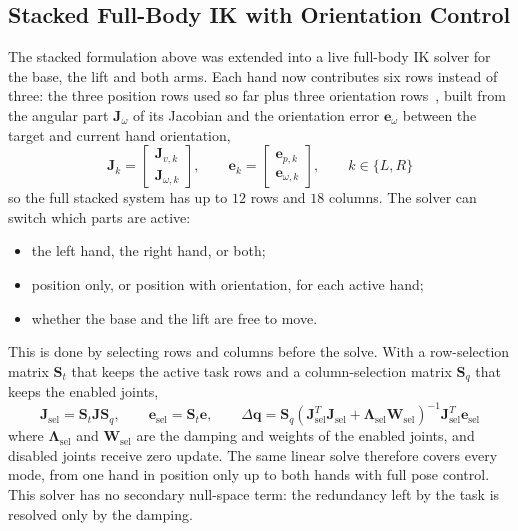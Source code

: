 \documentclass[12pt,a4paper]{article}
\begin{document}
\subsection*{Stacked Full-Body IK with Orientation Control}
The stacked formulation above was extended into a live full-body IK solver for the base, the lift and both arms. Each hand now contributes six rows instead of three: the three position rows used so far plus three orientation rows~\cite{schinstock1994}, built from the angular part $\mathbf{J}_{\omega}$ of its Jacobian and the orientation error $\mathbf{e}_{\omega}$ between the target and current hand orientation,
\begin{equation}
    \mathbf{J}_{k}=\begin{bmatrix}\mathbf{J}_{v,k}\\ \mathbf{J}_{\omega,k}\end{bmatrix},
    \qquad
    \mathbf{e}_{k}=\begin{bmatrix}\mathbf{e}_{p,k}\\ \mathbf{e}_{\omega,k}\end{bmatrix},
    \qquad k\in\{L,R\}
\end{equation}
so the full stacked system has up to $12$ rows and $18$ columns. The solver can switch which parts are active:
\begin{itemize}[nosep]
    \item the left hand, the right hand, or both;
    \item position only, or position with orientation, for each active hand;
    \item whether the base and the lift are free to move.
\end{itemize}
This is done by selecting rows and columns before the solve. With a row-selection matrix $\mathbf{S}_t$ that keeps the active task rows and a column-selection matrix $\mathbf{S}_q$ that keeps the enabled joints,
\begin{equation}
    \mathbf{J}_{\mathrm{sel}}=\mathbf{S}_t\mathbf{J}\mathbf{S}_q,
    \qquad
    \mathbf{e}_{\mathrm{sel}}=\mathbf{S}_t\mathbf{e},
    \qquad
    \Delta\mathbf{q}
    = \mathbf{S}_q\left(\mathbf{J}_{\mathrm{sel}}^{T}\mathbf{J}_{\mathrm{sel}} + \boldsymbol{\Lambda}_{\mathrm{sel}}\mathbf{W}_{\mathrm{sel}}\right)^{-1}\mathbf{J}_{\mathrm{sel}}^{T}\mathbf{e}_{\mathrm{sel}}
    \label{eq:selected_dls}
\end{equation}
where $\boldsymbol{\Lambda}_{\mathrm{sel}}$ and $\mathbf{W}_{\mathrm{sel}}$ are the damping and weights of the enabled joints, and disabled joints receive zero update. The same linear solve therefore covers every mode, from one hand in position only up to both hands with full pose control. This solver has no secondary null-space term: the redundancy left by the task is resolved only by the damping.
\end{document}
